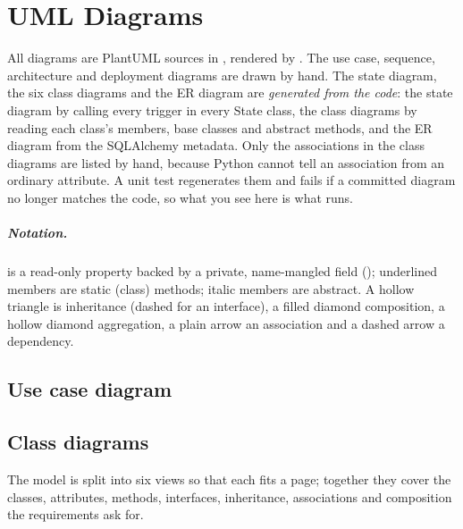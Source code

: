 \chapter{UML Diagrams}\label{ch:uml}

All diagrams are PlantUML sources in , rendered by . The
use case, sequence, architecture and deployment diagrams are drawn by hand. The state diagram,
the six class diagrams and the ER diagram are \emph{generated from the code}: the state
diagram by calling every trigger in every State class, the class diagrams by reading each
class's members, base classes and abstract methods, and the ER diagram from the SQLAlchemy
metadata. Only the associations in the class diagrams are listed by hand, because Python cannot
tell an association from an ordinary attribute. A unit test regenerates them and fails if a
committed diagram no longer matches the code, so what you see here is what runs.

\paragraph{Notation.}  is a read-only property backed by a
private, name-mangled field (); underlined members are static (class)
methods; italic members are abstract. A hollow triangle is inheritance (dashed for an
interface), a filled diamond composition, a hollow diamond aggregation, a plain arrow an
association and a dashed arrow a dependency.

\section{Use case diagram}

\section{Class diagrams}
The model is split into six views so that each fits a page; together they cover the classes,
attributes, methods, interfaces, inheritance, associations and composition the requirements
ask for.

